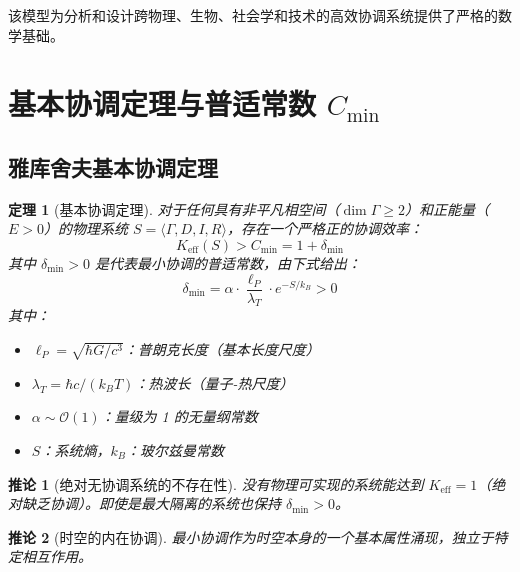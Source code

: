 \documentclass[11pt,a4paper]{article}
\newtheorem{theorem}{定理}
\newtheorem{corollary}{推论}
\begin{document}
	该模型为分析和设计跨物理、生物、社会学和技术的高效协调系统提供了严格的数学基础。
	
	
	\section{基本协调定理与普适常数 \texorpdfstring{$C_{\min}$}{C\_min}}
	\label{sec:fundamental-theorem}
	
	\subsection{雅库舍夫基本协调定理}
	
	\begin{theorem}[基本协调定理]
		对于任何具有非平凡相空间（$\dim\Gamma \geq 2$）和正能量（$E > 0$）的物理系统 $S = \langle \Gamma, D, I, R \rangle$，存在一个严格正的协调效率：
		\begin{equation}
			\boxed{K_{\mathrm{eff}}(S) > C_{\min} = 1 + \delta_{\min}}
		\end{equation}
		其中 $\delta_{\min} > 0$ 是代表最小协调的普适常数，由下式给出：
		\begin{equation}
			\delta_{\min} = \alpha \cdot \frac{\ell_P}{\lambda_T} \cdot e^{-S/k_B} > 0
		\end{equation}
		其中：
		\begin{itemize}
			\item $\ell_P = \sqrt{\hbar G/c^3}$：普朗克长度（基本长度尺度）
			\item $\lambda_T = \hbar c/(k_B T)$：热波长（量子-热尺度）
			\item $\alpha \sim \mathcal{O}(1)$：量级为 1 的无量纲常数
			\item $S$：系统熵，$k_B$：玻尔兹曼常数
		\end{itemize}
	\end{theorem}
	
	\begin{corollary}[绝对无协调系统的不存在性]
		没有物理可实现的系统能达到 $K_{\mathrm{eff}} = 1$（绝对缺乏协调）。即使是最大隔离的系统也保持 $\delta_{\min} > 0$。
	\end{corollary}
	
	\begin{corollary}[时空的内在协调]
		最小协调作为时空本身的一个基本属性涌现，独立于特定相互作用。
	\end{corollary}
	
\end{document}
